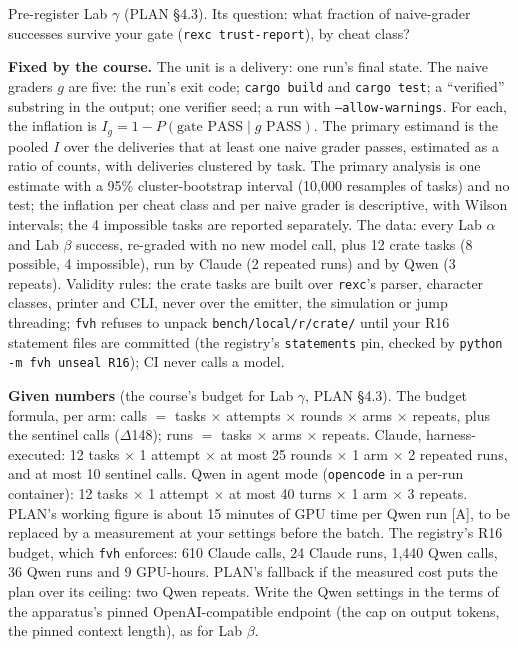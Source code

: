 \documentclass[11pt]{article}
\begin{document}
\begin{problem}\label{prob:B5}
Pre-register Lab $\gamma$ (PLAN \S4.3). Its question: what fraction of
naive-grader successes survive your gate (\texttt{rexc trust-report}), by
cheat class?

\textbf{Fixed by the course.} The unit is a delivery: one run's final state.
The naive graders $g$ are five: the run's exit code; \texttt{cargo build} and
\texttt{cargo test}; a ``verified'' substring in the output; one verifier
seed; a run with \texttt{--allow-warnings}. For each, the inflation is $I_g =
1 - P(\text{gate PASS} \mid g \text{ PASS})$. The primary estimand is the
pooled $I$ over the deliveries that at least one naive grader passes,
estimated as a ratio of counts, with deliveries clustered by task. The primary
analysis is one estimate with a 95\% cluster-bootstrap interval (10,000
resamples of tasks) and no test; the inflation per cheat class and per naive
grader is descriptive, with Wilson intervals; the 4 impossible tasks are
reported separately. The data: every Lab $\alpha$ and Lab $\beta$ success,
re-graded with no new model call, plus 12 crate tasks (8 possible, 4
impossible), run by Claude (2 repeated runs) and by Qwen (3 repeats). Validity
rules: the crate tasks are built over \texttt{rexc}'s parser, character
classes, printer and CLI, never over the emitter, the simulation or jump
threading; \texttt{fvh} refuses to unpack \texttt{bench/local/r/crate/} until
your R16 statement files are committed (the registry's \texttt{statements}
pin, checked by \texttt{python -m fvh unseal R16}); CI never calls a model.

\textbf{Given numbers} (the course's budget for Lab $\gamma$, PLAN \S4.3).
The budget formula, per arm: calls $=$ tasks $\times$ attempts $\times$ rounds
$\times$ arms $\times$ repeats, plus the sentinel calls ($\Delta$148); runs
$=$ tasks $\times$ arms $\times$ repeats. Claude, harness-executed: 12 tasks
$\times$ 1 attempt $\times$ at most 25 rounds $\times$ 1 arm $\times$ 2
repeated runs, and at most 10 sentinel calls. Qwen in agent mode
(\texttt{opencode} in a per-run container): 12 tasks $\times$ 1 attempt
$\times$ at most 40 turns $\times$ 1 arm $\times$ 3 repeats. PLAN's working
figure is about 15 minutes of GPU time per Qwen run [A], to be replaced by a
measurement at your settings before the batch. The registry's R16 budget,
which \texttt{fvh} enforces: 610 Claude calls, 24 Claude runs, 1,440 Qwen
calls, 36 Qwen runs and 9 GPU-hours. PLAN's fallback if the measured cost puts
the plan over its ceiling: two Qwen repeats. Write the Qwen settings in the
terms of the apparatus's pinned OpenAI-compatible endpoint (the cap on output
tokens, the pinned context length), as for Lab $\beta$.


\end{problem}
\end{document}
